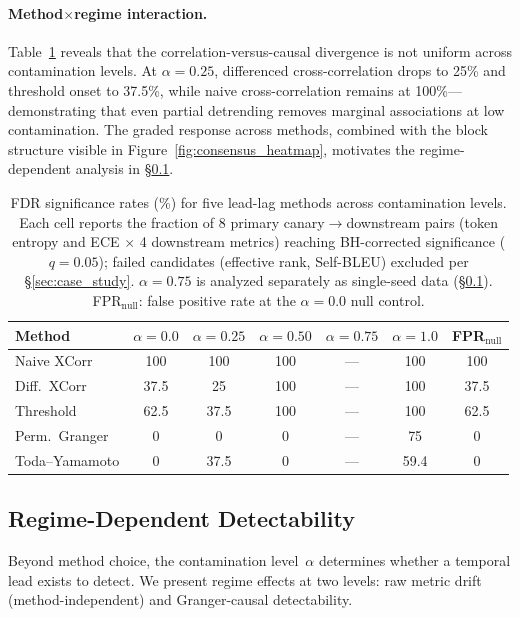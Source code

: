 \paragraph{Method$\times$regime interaction.}
Table~\ref{tab:method_comparison} reveals that the correlation-versus-causal divergence is not uniform across contamination levels.
At $\alpha{=}0.25$, differenced cross-correlation drops to 25\% and threshold onset to 37.5\%, while naive cross-correlation remains at 100\%---demonstrating that even partial detrending removes marginal associations at low contamination.
The graded response across methods, combined with the block structure visible in Figure~\ref{fig:consensus_heatmap}, motivates the regime-dependent analysis in \S\ref{sec:regime}.

\begin{table}[t]
\centering
\small
\caption{FDR significance rates (\%) for five lead-lag methods across contamination levels. Each cell reports the fraction of 8 primary canary$\to$downstream pairs (token entropy and ECE $\times$ 4 downstream metrics) reaching BH-corrected significance ($q{=}0.05$); failed candidates (effective rank, Self-BLEU) excluded per \S\ref{sec:case_study}. $\alpha{=}0.75$ is analyzed separately as single-seed data (\S\ref{sec:regime}). FPR$_\text{null}$: false positive rate at the $\alpha{=}0.0$ null control.}
\label{tab:method_comparison}
\begin{tabular}{lcccccc}
\toprule
Method & $\alpha{=}0.0$ & $\alpha{=}0.25$ & $\alpha{=}0.50$ & $\alpha{=}0.75$ & $\alpha{=}1.0$ & FPR$_\text{null}$ \\
\midrule
Naive XCorr     & 100   & 100  & 100  & ---  & 100   & 100  \\
Diff.\ XCorr   & 37.5  & 25   & 100  & ---  & 100   & 37.5 \\
Threshold       & 62.5  & 37.5 & 100  & ---  & 100   & 62.5 \\
Perm.\ Granger  & 0     & 0    & 0    & ---  & 75    & 0    \\
Toda--Yamamoto  & 0     & 37.5 & 0    & ---  & 59.4  & 0    \\
\bottomrule
\end{tabular}
\end{table}


\subsection{Regime-Dependent Detectability}
\label{sec:regime}

Beyond method choice, the contamination level~$\alpha$ determines whether a temporal lead exists to detect.
We present regime effects at two levels: raw metric drift (method-independent) and Granger-causal detectability.

